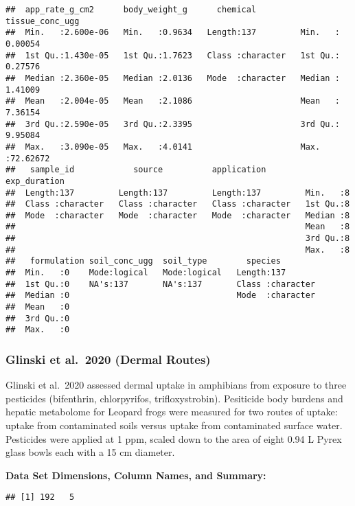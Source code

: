 \documentclass[
]{article}
\begin{document}
\begin{verbatim}
##  app_rate_g_cm2      body_weight_g      chemical         tissue_conc_ugg   
##  Min.   :2.600e-06   Min.   :0.9634   Length:137         Min.   : 0.00054  
##  1st Qu.:1.430e-05   1st Qu.:1.7623   Class :character   1st Qu.: 0.27576  
##  Median :2.360e-05   Median :2.0136   Mode  :character   Median : 1.41009  
##  Mean   :2.004e-05   Mean   :2.1086                      Mean   : 7.36154  
##  3rd Qu.:2.590e-05   3rd Qu.:2.3395                      3rd Qu.: 9.95084  
##  Max.   :3.090e-05   Max.   :4.0141                      Max.   :72.62672  
##   sample_id            source          application         exp_duration
##  Length:137         Length:137         Length:137         Min.   :8    
##  Class :character   Class :character   Class :character   1st Qu.:8    
##  Mode  :character   Mode  :character   Mode  :character   Median :8    
##                                                           Mean   :8    
##                                                           3rd Qu.:8    
##                                                           Max.   :8    
##   formulation soil_conc_ugg  soil_type        species         
##  Min.   :0    Mode:logical   Mode:logical   Length:137        
##  1st Qu.:0    NA's:137       NA's:137       Class :character  
##  Median :0                                  Mode  :character  
##  Mean   :0                                                    
##  3rd Qu.:0                                                    
##  Max.   :0
\end{verbatim}

\hypertarget{glinski-et-al.-2020-dermal-routes}{%
\subsubsection{Glinski et al.~2020 (Dermal
Routes)}\label{glinski-et-al.-2020-dermal-routes}}

Glinski et al.~2020 assessed dermal uptake in amphibians from exposure
to three pesticides (bifenthrin, chlorpyrifos, trifloxystrobin).
Pesiticide body burdens and hepatic metabolome for Leopard frogs were
measured for two routes of uptake: uptake from contaminated soils versus
uptake from contaminated surface water. Pesticides were applied at 1
ppm, scaled down to the area of eight 0.94 L Pyrex glass bowls each with
a 15 cm diameter.

\textbf{Data Set Dimensions, Column Names, and Summary:}

\begin{verbatim}
## [1] 192   5
\end{verbatim}
\end{document}
